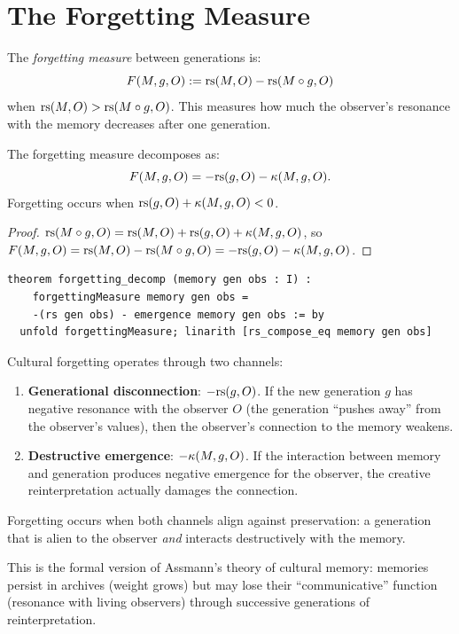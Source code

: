 \section{The Forgetting Measure}

\begin{definition}
The \emph{forgetting measure} between generations is:
\[
  F(M, g, O) := \mathrm{rs}(M, O) - \mathrm{rs}(M \circ g, O)
\]
when $\mathrm{rs}(M, O) > \mathrm{rs}(M \circ g, O)$.  This measures how much
the observer's resonance with the memory decreases after one generation.
\end{definition}

\begin{theorem}
\label{thm:forgetting-decomp}
The forgetting measure decomposes as:
\[
  F(M, g, O) = -\mathrm{rs}(g, O) - \kappa(M, g, O).
\]
Forgetting occurs when $\mathrm{rs}(g, O) + \kappa(M, g, O) < 0$.
\end{theorem}

\begin{proof}
$\mathrm{rs}(M \circ g, O) = \mathrm{rs}(M, O) + \mathrm{rs}(g, O) + \kappa(M, g, O)$,
so $F(M, g, O) = \mathrm{rs}(M, O) - \mathrm{rs}(M \circ g, O)
= -\mathrm{rs}(g, O) - \kappa(M, g, O)$.
\end{proof}

\begin{lstlisting}
theorem forgetting_decomp (memory gen obs : I) :
    forgettingMeasure memory gen obs =
    -(rs gen obs) - emergence memory gen obs := by
  unfold forgettingMeasure; linarith [rs_compose_eq memory gen obs]
\end{lstlisting}

\begin{interpretation}
Cultural forgetting operates through two channels:
\begin{enumerate}
\item \textbf{Generational disconnection}: $-\mathrm{rs}(g, O)$.  If the new
  generation $g$ has negative resonance with the observer $O$ (the
  generation ``pushes away'' from the observer's values), then the
  observer's connection to the memory weakens.
\item \textbf{Destructive emergence}: $-\kappa(M, g, O)$.  If the
  interaction between memory and generation produces negative emergence
  for the observer, the creative reinterpretation actually damages the
  connection.
\end{enumerate}
Forgetting occurs when both channels align against preservation:
a generation that is alien to the observer \emph{and} interacts
destructively with the memory.

This is the formal version of Assmann's theory of cultural memory:
memories persist in archives (weight grows) but may lose their
``communicative'' function (resonance with living observers) through
successive generations of reinterpretation.
\end{interpretation}

